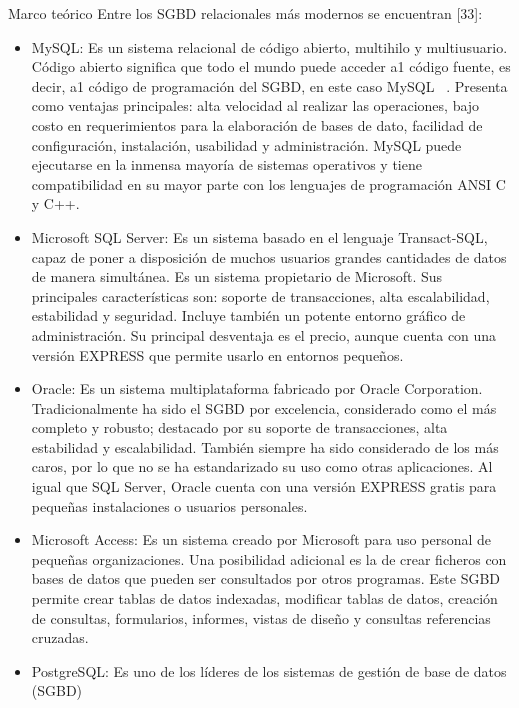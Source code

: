 \begin{thesischapter}{1} {Marco teórico}
    \vspace{10pt}
    Entre los SGBD relacionales más modernos se encuentran [33]:
    \begin{itemize}
        \item MySQL: Es un sistema relacional de código abierto, multihilo y multiusuario. Código
        abierto significa que todo el mundo puede acceder a1 código fuente, es decir, a1 código de
        programación del SGBD, en este caso MySQL ~\cite{ian2003biblia}. Presenta como ventajas principales: alta
        velocidad al realizar las operaciones, bajo costo en requerimientos para la elaboración de
        bases de dato, facilidad de configuración, instalación, usabilidad y administración. MySQL
        puede ejecutarse en la inmensa mayoría de sistemas operativos y tiene compatibilidad en su
        mayor parte con los lenguajes de programación ANSI C y C++.
        \item Microsoft SQL Server: Es un sistema basado en el lenguaje Transact-SQL, capaz de poner
        a disposición de muchos usuarios grandes cantidades de datos de manera simultánea. Es un
        sistema propietario de Microsoft. Sus principales características son: soporte de
        transacciones, alta escalabilidad, estabilidad y seguridad. Incluye también un potente entorno
        gráfico de administración. Su principal desventaja es el precio, aunque cuenta con una
        versión EXPRESS que permite usarlo en entornos pequeños.
        \item Oracle: Es un sistema multiplataforma fabricado por Oracle Corporation. Tradicionalmente
        ha sido el SGBD por excelencia, considerado como el más completo y robusto; destacado
        por su soporte de transacciones, alta estabilidad y escalabilidad. También siempre ha sido
        considerado de los más caros, por lo que no se ha estandarizado su uso como otras
        aplicaciones. Al igual que SQL Server, Oracle cuenta con una versión EXPRESS gratis para
        pequeñas instalaciones o usuarios personales.
        \item Microsoft Access: Es un sistema creado por Microsoft para uso personal de pequeñas
        organizaciones. Una posibilidad adicional es la de crear ficheros con bases de datos que
        pueden ser consultados por otros programas. Este SGBD permite crear tablas de datos
        indexadas, modificar tablas de datos, creación de consultas, formularios, informes, vistas de
        diseño y consultas referencias cruzadas.
        \item PostgreSQL: Es uno de los líderes de los sistemas de gestión de base de datos (SGBD)

\end{itemize}
\end{thesischapter}
